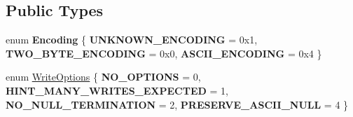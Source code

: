 \subsection*{Public Types}
\begin{DoxyCompactItemize}
\item 
\hypertarget{classv8_1_1_string_a2f4a2e9516c246eef602b889ce049c49}{}enum {\bfseries Encoding} \{ {\bfseries U\+N\+K\+N\+O\+W\+N\+\_\+\+E\+N\+C\+O\+D\+I\+N\+G} = 0x1, 
{\bfseries T\+W\+O\+\_\+\+B\+Y\+T\+E\+\_\+\+E\+N\+C\+O\+D\+I\+N\+G} = 0x0, 
{\bfseries A\+S\+C\+I\+I\+\_\+\+E\+N\+C\+O\+D\+I\+N\+G} = 0x4
 \}\label{classv8_1_1_string_a2f4a2e9516c246eef602b889ce049c49}

\item 
enum \hyperlink{classv8_1_1_string_a9ce7f1458ffd08f8eb2b9c8dc056e616}{Write\+Options} \{ {\bfseries N\+O\+\_\+\+O\+P\+T\+I\+O\+N\+S} = 0, 
{\bfseries H\+I\+N\+T\+\_\+\+M\+A\+N\+Y\+\_\+\+W\+R\+I\+T\+E\+S\+\_\+\+E\+X\+P\+E\+C\+T\+E\+D} = 1, 
{\bfseries N\+O\+\_\+\+N\+U\+L\+L\+\_\+\+T\+E\+R\+M\+I\+N\+A\+T\+I\+O\+N} = 2, 
{\bfseries P\+R\+E\+S\+E\+R\+V\+E\+\_\+\+A\+S\+C\+I\+I\+\_\+\+N\+U\+L\+L} = 4
 \}
\end{DoxyCompactItemize}

